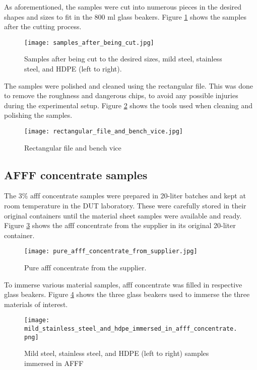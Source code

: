 As aforementioned, the samples were cut into numerous pieces in the desired shapes and sizes to fit in the 800 ml glass beakers. Figure \ref{ch4:figure:samples_cut} shows the samples after the cutting process.

\begin{figure}[H]
    \centering
    \texttt{[image: samples\_after\_being\_cut.jpg]}
    \caption{Samples after being cut to the desired sizes, mild steel, stainless steel, and HDPE (left to right).}
    \label{ch4:figure:samples_cut}
\end{figure}

The samples were polished and cleaned using the rectangular file. This was done to remove the roughness and dangerous chips, to avoid any possible injuries during the experimental setup. Figure \ref{ch4:figure:file_and_vice} shows the tools used when cleaning and polishing the samples.
 
\begin{figure}[H]
    \centering
    \texttt{[image: rectangular\_file\_and\_bench\_vice.jpg]}
    \caption{Rectangular file and bench vice}
    \label{ch4:figure:file_and_vice}
\end{figure}

\subsection{AFFF concentrate samples}
The 3\% \acrshort{afff} concentrate samples were prepared in 20-liter batches and kept at room temperature in the DUT laboratory. These were carefully stored in their original containers until the material sheet samples were available and ready. Figure \ref{ch4:figure:suplier} shows the \acrshort{afff} concentrate from the supplier in its original 20-liter container.
 
\begin{figure}[H]
    \centering
    \texttt{[image: pure\_afff\_concentrate\_from\_supplier.jpg]}
    \caption{Pure \acrshort{afff} concentrate from the supplier.}
    \label{ch4:figure:suplier}
\end{figure}

To immerse various material samples, \acrshort{afff} concentrate was filled in respective glass beakers. Figure \ref{ch4:figure:immersed} shows the three glass beakers used to immerse the three materials of interest.
 
\begin{figure}[H]
\texttt{[image: mild\_stainless\_steel\_and\_hdpe\_immersed\_in\_afff\_concentrate.png]}
\caption{Mild steel, stainless steel, and HDPE (left to right) samples immersed in AFFF}
\label{ch4:figure:immersed}
\end{figure}

